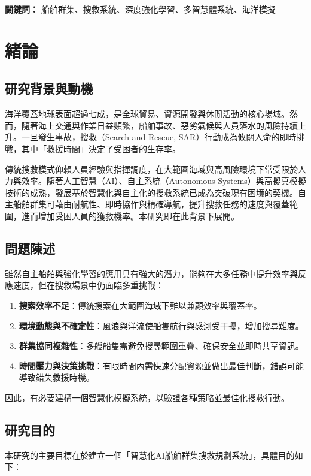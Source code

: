 \documentclass[12pt,a4paper]{article}
\begin{document}
\centerline{\textbf{關鍵詞：} 船舶群集、搜救系統、深度強化學習、多智慧體系統、海洋模擬}

\newpage

\tableofcontents
\newpage

\section{緒論}

\subsection{研究背景與動機}
海洋覆蓋地球表面超過七成，是全球貿易、資源開發與休閒活動的核心場域。然而，隨著海上交通與作業日益頻繁，船舶事故、惡劣氣候與人員落水的風險持續上升。一旦發生事故，搜救（Search and Rescue, SAR）行動成為攸關人命的即時挑戰，其中「救援時間」決定了受困者的生存率\cite{NOAA}。

傳統搜救模式仰賴人員經驗與指揮調度，在大範圍海域與高風險環境下常受限於人力與效率。隨著人工智慧（AI）、自主系統（Autonomous Systems）與高擬真模擬技術的成熟，發展基於智慧化與自主化的搜救系統已成為突破現有困境的契機。自主船舶群集可藉由耐航性、即時協作與精確導航，提升搜救任務的速度與覆蓋範圍，進而增加受困人員的獲救機率\cite{GroupMobile}。本研究即在此背景下展開。

\subsection{問題陳述}
雖然自主船舶與強化學習的應用具有強大的潛力，能夠在大多任務中提升效率與反應速度，但在搜救場景中仍面臨多重挑戰\cite{KilicChallenge}\cite{KilicRL}\cite{NOAA}：

\begin{enumerate}
\item \textbf{搜索效率不足}：傳統搜索在大範圍海域下難以兼顧效率與覆蓋率。
\item \textbf{環境動態與不確定性}：風浪與洋流使船隻航行與感測受干擾，增加搜尋難度\cite{IAMSAR2008}。
\item \textbf{群集協同複雜性}：多艘船隻需避免搜尋範圍重疊、確保安全並即時共享資訊\cite{IAMSAR2008}。
\item \textbf{時間壓力與決策挑戰}：有限時間內需快速分配資源並做出最佳判斷，錯誤可能導致錯失救援時機。
\end{enumerate}

因此，有必要建構一個智慧化模擬系統，以驗證各種策略並最佳化搜救行動。

\subsection{研究目的}
本研究的主要目標在於建立一個「智慧化AI船舶群集搜救規劃系統」，具體目的如下：
\end{document}

